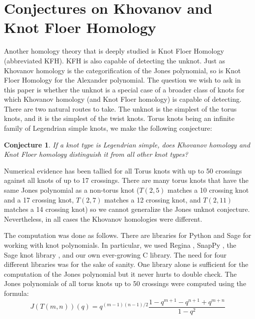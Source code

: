 \documentclass{article}
\theoremstyle{plain}
\newtheorem{conjecture}{Conjecture}
\begin{document}
	\section{Conjectures on Khovanov and Knot Floer Homology}
	    Another homology theory that is deeply studied is Knot Floer Homology
	    (abbreviated KFH). KFH is also capable of detecting the unknot. Just as
	    Khovanov homology is the categorification of the Jones polynomial, so
	    is Knot Floer Homology for the Alexander polynomial.
	    The question we wish to ask in this paper is whether the unknot is
	    a special case of a broader class of knots for which Khovanov homology
	    (and Knot Floer homology) is capable of detecting. There are two
	    natural routes to take. The unknot is the simplest of the torus knots,
	    and it is the simplest of the twist knots. Torus knots being an
	    infinite family of Legendrian simple knots, we make the following
	    conjecture:
	    \begin{conjecture}
	        If a knot type is Legendrian simple, does Khovanov homology and
	        Knot Floer homology distinguish it from all other knot types?
	    \end{conjecture}
	    Numerical evidence has been tallied for all Torus knots with up to 50
	    crossings against all knots of up to 17 crossings. There are many
	    torus knots that have the same Jones polynomial as a non-torus knot
	    ($T(2,5)$ matches a 10 crossing knot and a 17 crossing knot, $T(2,7)$
	    matches a 12 crossing knot, and $T(2,11)$ matches a 14 crossing knot)
	    so we cannot generalize the Jones unknot conjecture. Nevertheless, in
	    all cases the Khovanov homologies were different.
	    \par\hfill\par
	    The computation was done as follows. There are libraries for Python and
	    Sage for working with knot polynomials. In particular, we used
	    Regina \cite{regina}, SnapPy \cite{SnapPy}, the Sage knot library
	    \cite{sage}, and our own ever-growing C library. The need for four
	    different libraries was for the sake of sanity. One library alone is
	    sufficient for the computation of the Jones polynomial but it never
	    hurts to double check. The Jones polynomials of all torus knots up to
	    50 crossings were computed using the formula:
	    \begin{equation}
	        J(T(m,n))(q)=q^{(m-1)(n-1)/2}
	            \frac{1-q^{m+1}-q^{n+1}+q^{m+n}}{1-q^{2}}
	    \end{equation}
\end{document}
